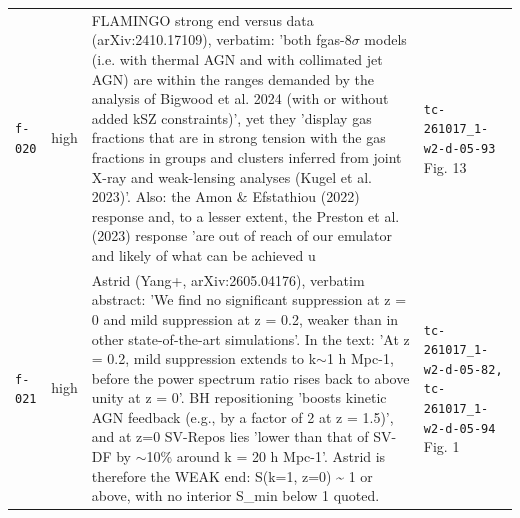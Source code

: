\documentclass[11pt,a4paper]{article}
\begin{document}
\begin{longtable}{@{}p{}p{}p{}p{}@{}}
\texttt{f-020} & high & FLAMINGO strong end versus data (arXiv:2410.17109), verbatim: 'both fgas-8$\sigma$ models (i.e. with thermal AGN and with collimated jet AGN) are within the ranges demanded by the analysis of Bigwood et al. 2024 (with or without added kSZ constraints)', yet they 'display gas fractions that are in strong tension with the gas fractions in groups and clusters inferred from joint X-ray and weak-lensing analyses (Kugel et al. 2023)'. Also: the Amon \& Efstathiou (2022) response and, to a lesser extent, the Preston et al. (2023) response 'are out of reach of our emulator and likely of what can be achieved u & \texttt{tc-261017\_\allowbreak{}1-w2-d-05-93} Fig. 13 \\
\texttt{f-021} & high & Astrid (Yang+, arXiv:2605.04176), verbatim abstract: 'We find no significant suppression at z = 0 and mild suppression at z = 0.2, weaker than in other state-of-the-art simulations'. In the text: 'At z = 0.2, mild suppression extends to k$\sim$1 h Mpc-1, before the power spectrum ratio rises back to above unity at z = 0'. BH repositioning 'boosts kinetic AGN feedback (e.g., by a factor of 2 at z = 1.5)', and at z=0 SV-Repos lies 'lower than that of SV-DF by $\sim$10\% around k = 20 h Mpc-1'. Astrid is therefore the WEAK end: S(k=1, z=0) \textasciitilde{} 1 or above, with no interior S\_min below 1 quoted. & \texttt{tc-261017\_\allowbreak{}1-w2-d-05-82,\allowbreak{} tc-261017\_\allowbreak{}1-w2-d-05-94} Fig. 1 \\
\bottomrule\end{longtable}
\end{document}
